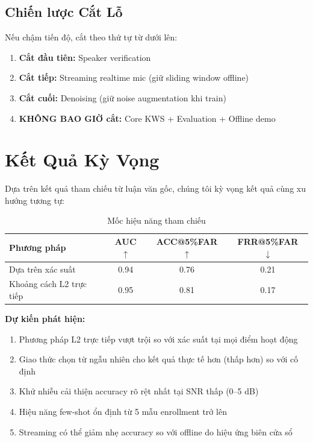 \documentclass[12pt,a4paper]{report}
\begin{document}
\section{Chiến lược Cắt Lỗ}

Nếu chậm tiến độ, cắt theo thứ tự từ dưới lên:
\begin{enumerate}
    \item \textbf{Cắt đầu tiên:} Speaker verification
    \item \textbf{Cắt tiếp:} Streaming realtime mic (giữ sliding window offline)
    \item \textbf{Cắt cuối:} Denoising (giữ noise augmentation khi train)
    \item \textbf{KHÔNG BAO GIỜ cắt:} Core KWS + Evaluation + Offline demo
\end{enumerate}


\chapter{Kết Quả Kỳ Vọng}

Dựa trên kết quả tham chiếu từ luận văn gốc, chúng tôi kỳ vọng kết quả
cùng xu hướng tương tự:

\begin{table}[h]
\centering
\caption{Mốc hiệu năng tham chiếu}
\begin{tabular}{lccc}
\toprule
\textbf{Phương pháp} & \textbf{AUC} $\uparrow$ &
\textbf{ACC@5\%FAR} $\uparrow$ & \textbf{FRR@5\%FAR} $\downarrow$ \\
\midrule
Dựa trên xác suất & 0.94 & 0.76 & 0.21 \\
Khoảng cách L2 trực tiếp & 0.95 & 0.81 & 0.17 \\
\bottomrule
\end{tabular}
\end{table}

\textbf{Dự kiến phát hiện:}
\begin{enumerate}
    \item Phương pháp L2 trực tiếp vượt trội so với xác suất tại mọi
          điểm hoạt động
    \item Giao thức chọn từ ngẫu nhiên cho kết quả thực tế hơn (thấp hơn)
          so với cố định
    \item Khử nhiễu cải thiện accuracy rõ rệt nhất tại SNR thấp (0--5 dB)
    \item Hiệu năng few-shot ổn định từ 5 mẫu enrollment trở lên
    \item Streaming có thể giảm nhẹ accuracy so với offline do hiệu ứng
          biên cửa sổ
\end{enumerate}
\end{document}
